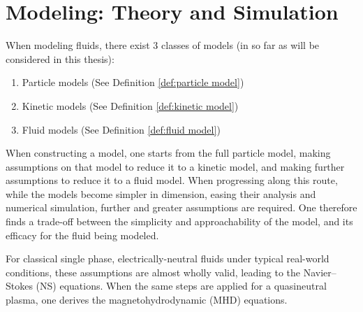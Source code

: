 \section{Modeling: Theory and Simulation}\label{cha:plasma modeling}
    When modeling fluids, there exist 3 classes of models (in so far as will be considered in this thesis):
    \begin{enumerate}
        \item  Particle models (See Definition \ref{def:particle model})
        \item  Kinetic models (See Definition \ref{def:kinetic model})
        \item  Fluid models (See Definition \ref{def:fluid model})
    \end{enumerate}
    When constructing a model, one starts from the full particle model, making assumptions on that model to reduce it to a kinetic model, and making further assumptions to reduce it to a fluid model. When progressing along this route, while the models become simpler in dimension, easing their analysis and numerical simulation, further and greater assumptions are required. One therefore finds a trade-off between the simplicity and approachability of the model, and its efficacy for the fluid being modeled.
    
    \begin{center}\end{center}

    For classical single phase, electrically-neutral fluids under typical real-world conditions, these assumptions are almost wholly valid, leading to the Navier--Stokes (NS) equations. When the same steps are applied for a quasineutral plasma, one derives the magnetohydrodynamic (MHD) equations.
    
